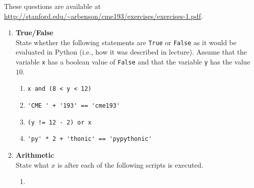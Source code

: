 \documentclass{article}
\begin{document}
\pagestyle{fancy}

These questions are available at \url{http://stanford.edu/~arbenson/cme193/exercises/exercises-1.pdf}.


\begin{enumerate}
\item \textbf{True/False} \\
State whether the following statements are \texttt{True} or \texttt{False} as it would be evaluated in Python (i.e., how it was described in lecture).  Assume that the variable \texttt{x} has a boolean value of \texttt{False} and that the variable \texttt{y} has the value $10$.

\begin{enumerate}
\item
\begin{lstlisting}
x and (8 < y < 12)
\end{lstlisting}
\end{enumerate}

\begin{enumerate}
\setcounter{enumii}{1}
\item 
\begin{lstlisting}
'CME ' + '193' == 'cme193'
\end{lstlisting}
\end{enumerate}

\begin{enumerate}
\setcounter{enumii}{2}
\item 
\begin{lstlisting}
(y != 12 - 2) or x
\end{lstlisting}
\end{enumerate}

\begin{enumerate}
\setcounter{enumii}{3}
\item 
\begin{lstlisting}
'py' * 2 + 'thonic' == 'pypythonic'
\end{lstlisting}
\end{enumerate}

\item \textbf{Arithmetic} \\
State what $x$ is after each of the following scripts is executed.

\begin{enumerate}
\item 
\end{enumerate}


\end{enumerate}
\end{document}
